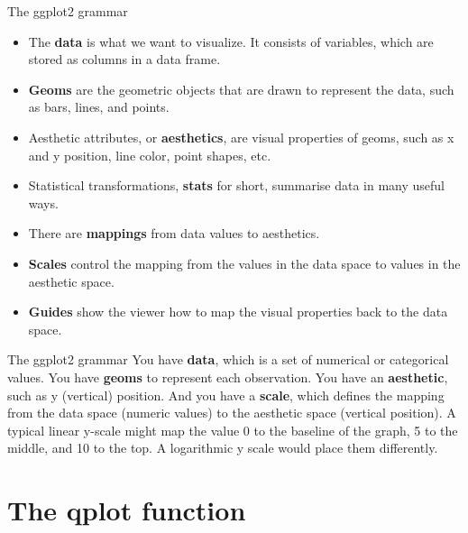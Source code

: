\documentclass{beamer}\usepackage[]{graphicx}\usepackage[]{color}
\begin{document}
\begin{frame}{The ggplot2 grammar}
\begin{itemize}

\item  The \textbf{data} is what we want to visualize. It consists of variables, which are stored as columns in a data frame.
\item \textbf{Geoms} are the geometric objects that are drawn to represent the data, such as bars, lines, and points.
\item Aesthetic attributes, or \textbf{aesthetics}, are visual properties of geoms, such as x and y position, line color, point shapes, etc.
\item Statistical transformations, \textbf{stats} for short, summarise data in many useful ways.
\item There are \textbf{mappings} from data values to aesthetics.
\item  \textbf{Scales} control the mapping from the values in the data space to values in the aesthetic space. 
\item \textbf{Guides }show the viewer how to map the visual properties back to the data space. 
\end{itemize}
\end{frame}

\begin{frame}{The ggplot2 grammar}
You have \textbf{data}, which is a set of numerical or categorical values. You have \textbf{geoms} to represent each observation. You have an \textbf{aesthetic}, such as y (vertical) position. And you have a \textbf{scale}, which defines the mapping
from the data space (numeric values) to the aesthetic space (vertical position). A typical linear y-scale might map the value 0 to the baseline of the graph, 5 to the middle, and 10 to the top. A logarithmic y scale would place them differently.
\end{frame}

\section{The qplot function}
\end{document}
